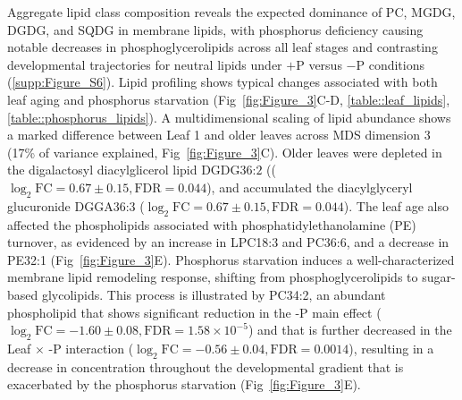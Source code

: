 \documentclass[9pt,twocolumn,twoside]{rilabRxiv}
\begin{document}
Aggregate lipid class composition reveals the expected dominance of PC, MGDG, DGDG, and SQDG in membrane lipids, with phosphorus deficiency causing notable decreases in phosphoglycerolipids across all leaf stages and contrasting developmental trajectories for neutral lipids under $+$P versus $-$P conditions (\ref{supp:Figure_S6}).
Lipid profiling shows typical changes associated with both leaf aging and phosphorus starvation (Fig~\ref{fig:Figure_3}C-D, \ref{table::leaf_lipids}, \ref{table::phosphorus_lipids}).
A multidimensional scaling of lipid abundance shows a marked difference between Leaf 1 and older leaves across MDS dimension 3 (17\% of variance explained, Fig~\ref{fig:Figure_3}C).
Older leaves were depleted in the digalactosyl diacylglicerol lipid $\text{DGDG36:2}$ (($\log_2\text{FC}=0.67 \pm 0.15, \text{FDR}=0.044$), and  accumulated  the diacylglyceryl glucuronide DGGA36:3 ($\log_2\text{FC}=0.67 \pm 0.15, \text{FDR}=0.044$).
The leaf age also affected the phospholipids associated with phosphatidylethanolamine (PE) turnover, as evidenced by an increase in LPC18:3 and PC36:6, and a decrease in PE32:1 (Fig~\ref{fig:Figure_3}E).
Phosphorus starvation induces a well-characterized membrane lipid remodeling response, shifting from phosphoglycerolipids to sugar-based glycolipids.
This process is illustrated by PC34:2, an abundant phospholipid that shows significant reduction in the -P main effect ($\log_2\text{FC}=-1.60 \pm 0.08, \text{FDR}=1.58 \times 10^{-5}$) and that is further decreased in the Leaf $\times$ -P interaction ($\log_2\text{FC}=-0.56 \pm 0.04, \text{FDR}=0.0014$), resulting in a decrease in concentration throughout the developmental gradient that is exacerbated by the phosphorus starvation (Fig~\ref{fig:Figure_3}E).
\end{document}
